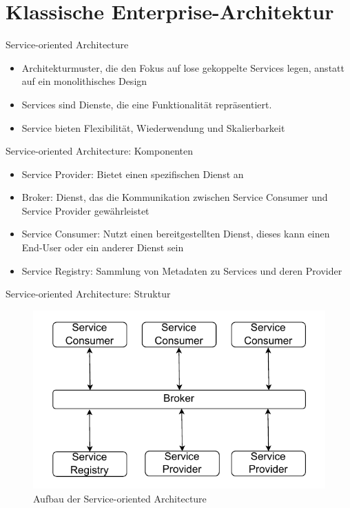 \section{Klassische Enterprise-Architektur}


\begin{frame}{Service-oriented Architecture}
  \begin{itemize}
    \item Architekturmuster, die den Fokus auf lose gekoppelte Services legen, anstatt auf ein monolithisches Design
    \item Services sind Dienste, die eine Funktionalität repräsentiert.
    \item Service bieten Flexibilität, Wiederwendung und Skalierbarkeit
  \end{itemize}
\end{frame}

\begin{frame}{Service-oriented Architecture: Komponenten}
  \begin{itemize}
    \item Service Provider: Bietet einen spezifischen Dienst an
    \item Broker: Dienst, das die Kommunikation zwischen Service Consumer und Service Provider gewährleistet
    \item Service Consumer: Nutzt einen bereitgestellten Dienst, dieses kann einen End-User oder ein anderer Dienst sein
    \item Service Registry: Sammlung von Metadaten zu Services und deren Provider
  \end{itemize}
\end{frame}

\begin{frame}{Service-oriented Architecture: Struktur}
  \begin{figure}[!h]
    \centering
    \includegraphics[scale=0.80]{imglib/soa/soa}
    \caption{Aufbau der Service-oriented Architecture}
    \label{fig:soa}
  \end{figure}
\end{frame}

